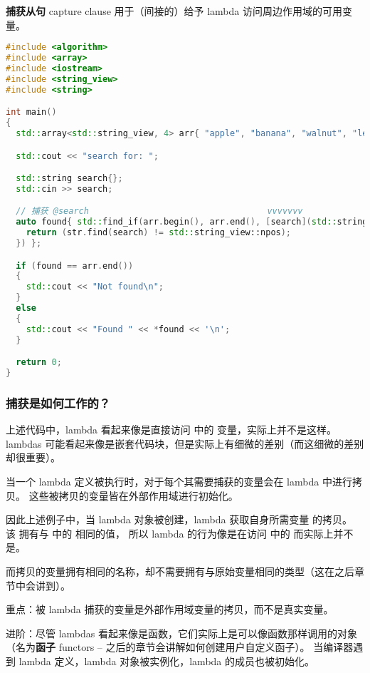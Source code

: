\documentclass[../../LearnCpp.tex]{subfiles}
\begin{document}

\textbf{捕获从句} capture clause 用于（间接的）给予 lambda 访问周边作用域的可用变量。

\begin{lstlisting}[language=C++]
#include <algorithm>
#include <array>
#include <iostream>
#include <string_view>
#include <string>

int main()
{
  std::array<std::string_view, 4> arr{ "apple", "banana", "walnut", "lemon" };

  std::cout << "search for: ";

  std::string search{};
  std::cin >> search;

  // 捕获 @search                                   vvvvvvv
  auto found{ std::find_if(arr.begin(), arr.end(), [search](std::string_view str) {
    return (str.find(search) != std::string_view::npos);
  }) };

  if (found == arr.end())
  {
    std::cout << "Not found\n";
  }
  else
  {
    std::cout << "Found " << *found << '\n';
  }

  return 0;
}
\end{lstlisting}

\subsubsection*{捕获是如何工作的？}

上述代码中，lambda 看起来像是直接访问  中的  变量，实际上并不是这样。
lambdas 可能看起来像是嵌套代码块，但是实际上有细微的差别（而这细微的差别却很重要）。

当一个 lambda 定义被执行时，对于每个其需要捕获的变量会在 lambda 中进行拷贝。
这些被拷贝的变量皆在外部作用域进行初始化。

因此上述例子中，当 lambda 对象被创建，lambda 获取自身所需变量  的拷贝。
该  拥有与  中的  相同的值，
所以 lambda 的行为像是在访问  中的  而实际上并不是。

而拷贝的变量拥有相同的名称，却不需要拥有与原始变量相同的类型（这在之后章节中会讲到）。

重点：被 lambda 捕获的变量是外部作用域变量的拷贝，而不是真实变量。

进阶：尽管 lambdas 看起来像是函数，它们实际上是可以像函数那样调用的对象
（名为\textbf{函子} functors -- 之后的章节会讲解如何创建用户自定义函子）。
当编译器遇到 lambda 定义，lambda 对象被实例化，lambda 的成员也被初始化。
\end{document}
